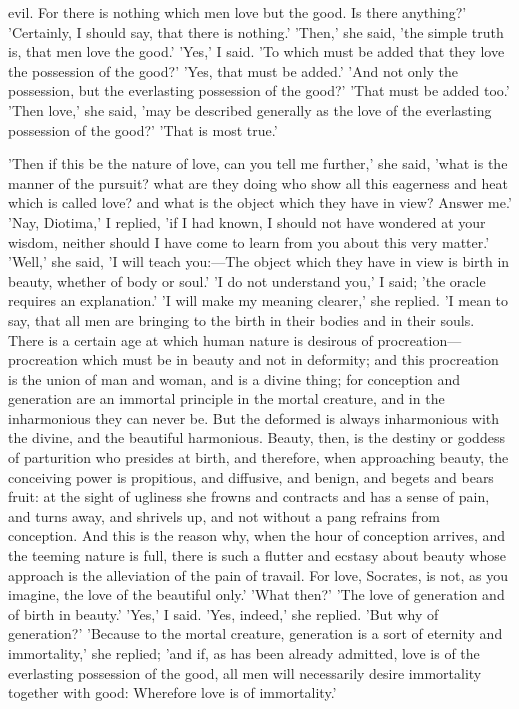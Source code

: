 \documentclass[11pt,letter]{article}
\begin{document}
evil. For there is nothing which men love but the good. Is there anything?' 'Certainly, I should say, that there is nothing.' 'Then,' she said, 'the simple truth is, that men love the good.' 'Yes,' I said. 'To which must be added that they love the possession of the good?' 'Yes, that must be added.' 'And not only the possession, but the everlasting possession of the good?' 'That must be added too.' 'Then love,' she said, 'may be described generally as the love of the everlasting possession of the good?' 'That is most true.'

\par  'Then if this be the nature of love, can you tell me further,' she said, 'what is the manner of the pursuit? what are they doing who show all this eagerness and heat which is called love? and what is the object which they have in view? Answer me.' 'Nay, Diotima,' I replied, 'if I had known, I should not have wondered at your wisdom, neither should I have come to learn from you about this very matter.' 'Well,' she said, 'I will teach you:—The object which they have in view is birth in beauty, whether of body or soul.' 'I do not understand you,' I said; 'the oracle requires an explanation.' 'I will make my meaning clearer,' she replied. 'I mean to say, that all men are bringing to the birth in their bodies and in their souls. There is a certain age at which human nature is desirous of procreation—procreation which must be in beauty and not in deformity; and this procreation is the union of man and woman, and is a divine thing; for conception and generation are an immortal principle in the mortal creature, and in the inharmonious they can never be. But the deformed is always inharmonious with the divine, and the beautiful harmonious. Beauty, then, is the destiny or goddess of parturition who presides at birth, and therefore, when approaching beauty, the conceiving power is propitious, and diffusive, and benign, and begets and bears fruit: at the sight of ugliness she frowns and contracts and has a sense of pain, and turns away, and shrivels up, and not without a pang refrains from conception. And this is the reason why, when the hour of conception arrives, and the teeming nature is full, there is such a flutter and ecstasy about beauty whose approach is the alleviation of the pain of travail. For love, Socrates, is not, as you imagine, the love of the beautiful only.' 'What then?' 'The love of generation and of birth in beauty.' 'Yes,' I said. 'Yes, indeed,' she replied. 'But why of generation?' 'Because to the mortal creature, generation is a sort of eternity and immortality,' she replied; 'and if, as has been already admitted, love is of the everlasting possession of the good, all men will necessarily desire immortality together with good: Wherefore love is of immortality.'
\end{document}
